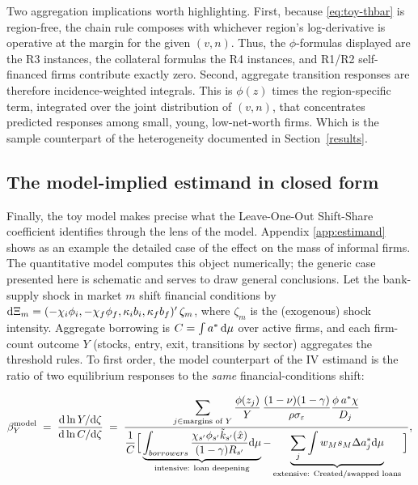 \documentclass[12pt]{article}
\begin{document}
Two aggregation implications worth highlighting. First, because \eqref{eq:toy-thbar} is region-free, the chain rule composes with whichever region's log-derivative is operative at the margin for the given $(v,n)$. Thus, the $\phi$-formulas displayed are the R3 instances, the collateral formulas the R4 instances, and R1/R2 self-financed firms contribute exactly zero. Second, aggregate transition responses are therefore incidence-weighted integrals. This is $\phi(z)$ times the region-specific term, integrated over the joint distribution of $(v,n)$, that concentrates predicted responses among small, young, low-net-worth firms. Which is the sample counterpart of the heterogeneity documented in Section~\ref{results}.

\subsection{The model-implied estimand in closed form}

Finally, the toy model makes precise what the Leave-One-Out Shift-Share
coefficient identifies through the lens of the model. Appendix \ref{app:estimand} shows as an example the detailed case of the effect on the mass of informal firms. The quantitative model computes this object numerically; the generic case presented here is schematic and serves to draw general conclusions. Let the
bank-supply shock in market $m$ shift financial conditions by
$\mathrm{d}\Xi_{m}
=(-\chi_{i}\phi_{i},-\chi_{f}\phi_{f},
\kappa_{i}b_{i},\kappa_{f}b_{f})'\,
\zeta_{m}$, where $\zeta_{m}$ is the (exogenous) shock intensity.
Aggregate borrowing is
$C=\int a^{*}\,\mathrm{d}\mu$ over active firms, and each firm-count outcome
$Y$ (stocks, entry, exit, transitions by sector) aggregates the
threshold rules. To first order, the model counterpart of the IV
estimand is the ratio of two equilibrium responses to the \emph{same}
financial-conditions shift:

\begin{equation}
  \beta_{Y}^{\text{model}}
  \;=\;
  \frac{\mathrm{d}\ln Y/\mathrm{d}\zeta}{\mathrm{d}\ln C/\mathrm{d}\zeta}
  \;=\;
  \frac{\displaystyle\sum_{j\in\text{margins of }Y}
        \frac{\phi(z_{j})}{Y}\,
        \frac{(1-\nu)(1-\gamma)}{\rho\sigma_{\varepsilon}}
        \frac{\phi_{}\,a^{*}\chi}{D_{j}} }
       {\displaystyle \frac{1}{C} \Big[\underbrace{\int_{borrowers}
        \frac{\chi_{s'} \phi_{s'} \tilde{k}_{s'}(\hat{x})}{(1-\gamma)R_{s'}}\mathrm{d}\mu}_{\text{intensive: loan deepening}}
        -\underbrace{\sum_{j} \int w_M s_M \Delta a^{*}_{j} \mathrm{d} \mu }_{\text{extensive: Created/swapped loans}}\Big]} ,
  \label{eq:toy-estimand}
\end{equation}
\end{document}
